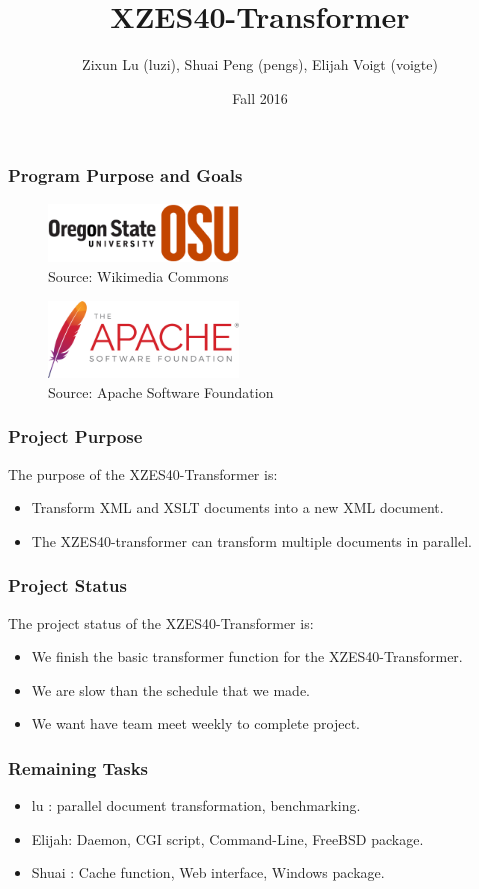 \documentclass{beamer}
\title{XZES40-Transformer}
\author{Zixun Lu (luzi),
  Shuai Peng (pengs),
  Elijah Voigt (voigte)}
\institute{CS 461 | CS Senior Capstone | Group \#40}
\date{Fall 2016}
\begin{document}
 
\frame{\titlepage}

\begin{frame}
  \frametitle{Program Purpose and Goals }
\begin{figure}
	\centering
    \includegraphics[width=0.45\textwidth]{figures/osu-logo}
    \caption{Source: Wikimedia Commons \cite{osu-logo}}
\end{figure}

\begin{figure}
	\centering
    \includegraphics[width=0.45\textwidth]{figures/asf-logo}
    \caption{Source: Apache Software Foundation \cite{asf-logo}}
\end{figure}
\end{frame}

\begin{frame}
  \frametitle{Project Purpose}
  The purpose of the XZES40-Transformer is:
  \begin{itemize}
  \item Transform XML and XSLT documents into a new XML document.
  \item The XZES40-transformer can transform multiple documents in parallel. 
  \end{itemize}
\end{frame}

\begin{frame}
  \frametitle{Project Status}
  The project status of the XZES40-Transformer is:
  \begin{itemize}
    \item We finish the basic transformer function for the XZES40-Transformer.
    \item We are slow than the schedule that we made.
    \item We want have team meet weekly to complete project.
  \end{itemize}
\end{frame}

\begin{frame}
  \frametitle{Remaining Tasks}
  \begin{itemize}
    \item lu    : parallel document transformation, benchmarking.
    \item Elijah: Daemon, CGI script, Command-Line, FreeBSD package.
    \item Shuai : Cache function, Web interface, Windows package.
  \end{itemize}
\end{frame}
\end{document}
